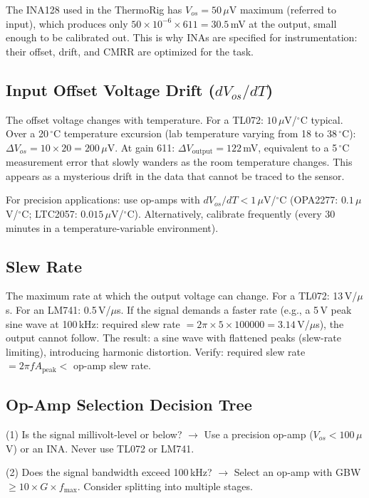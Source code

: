 \documentclass[11pt,letterpaper,twoside,openany]{book}
\newcommand{\degC}{\ensuremath{{}^{\circ}\text{C}}}
\begin{document}
The INA128 used in the ThermoRig has $V_{os} = 50\,\mu$V maximum (referred to input), which produces only $50 \times 10^{-6} \times 611 = 30.5$\,mV at the output, small enough to be calibrated out. This is why INAs are specified for instrumentation: their offset, drift, and CMRR are optimized for the task.

\subsection{Input Offset Voltage Drift ($dV_{os}/dT$)}
The offset voltage changes with temperature. For a TL072: $10\,\mu$V/\degC{} typical. Over a 20\,\degC{} temperature excursion (lab temperature varying from 18 to 38\,\degC{}): $\Delta V_{os} = 10 \times 20 = 200\,\mu$V. At gain 611: $\Delta V_{\text{output}} = 122$\,mV, equivalent to a 5\,\degC{} measurement error that slowly wanders as the room temperature changes. This appears as a mysterious drift in the data that cannot be traced to the sensor.

For precision applications: use op-amps with $dV_{os}/dT < 1\,\mu$V/\degC{} (OPA2277: $0.1\,\mu$V/\degC{}; LTC2057: $0.015\,\mu$V/\degC{}). Alternatively, calibrate frequently (every 30 minutes in a temperature-variable environment).

\subsection{Slew Rate}
The maximum rate at which the output voltage can change. For a TL072: 13\,V/$\mu$s. For an LM741: 0.5\,V/$\mu$s. If the signal demands a faster rate (e.g., a 5\,V peak sine wave at 100\,kHz: required slew rate $= 2\pi \times 5 \times 100000 = 3.14$\,V/$\mu$s), the output cannot follow. The result: a sine wave with flattened peaks (slew-rate limiting), introducing harmonic distortion. Verify: required slew rate $= 2\pi f A_{\text{peak}} < $ op-amp slew rate.

\subsection{Op-Amp Selection Decision Tree}
(1) Is the signal millivolt-level or below? $\to$ Use a precision op-amp ($V_{os} < 100\,\mu$V) or an INA. Never use TL072 or LM741.

(2) Does the signal bandwidth exceed 100\,kHz? $\to$ Select an op-amp with GBW $\geq 10 \times G \times f_{\text{max}}$. Consider splitting into multiple stages.
\end{document}
